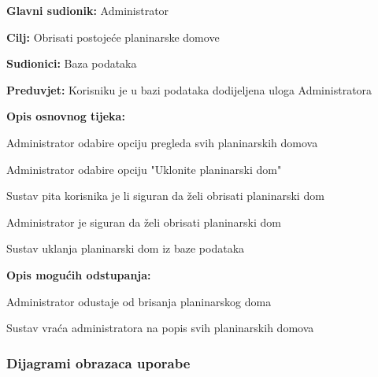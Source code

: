 		\begin{packed_item}
			
			\item \textbf{Glavni sudionik: }$ $Administrator$ $
			\item  \textbf{Cilj:} $ $Obrisati postojeće planinarske domove $ $
			\item  \textbf{Sudionici:} $ $Baza podataka $ $
			\item  \textbf{Preduvjet:} $ $Korisniku je u bazi podataka dodijeljena uloga Administratora$ $
			\item  \textbf{Opis osnovnog tijeka:}
			
			\item[] \begin{packed_enum}
				
				\item $ $Administrator odabire opciju pregleda svih planinarskih domova$ $
				\item $ $Administrator odabire opciju "Uklonite planinarski dom"$ $ 
				\item $ $Sustav pita korisnika je li siguran da želi obrisati planinarski dom$ $
				\item $ $Administrator je siguran da želi obrisati planinarski dom$ $
				\item $ $Sustav uklanja planinarski dom iz baze podataka $ $
				
			\end{packed_enum}
			
			\item  \textbf{Opis mogućih odstupanja:}
			
			\item[] \begin{packed_item}
				
				\item[1.a] $ $Administrator odustaje od brisanja planinarskog doma$ $
				\item[] \begin{packed_enum}
					
					\item $ $Sustav vraća administratora na popis svih planinarskih domova$ $
				\end{packed_enum}
			\end{packed_item}
			
		\end{packed_item}
	
		
		\subsubsection{Dijagrami obrazaca uporabe}
		
